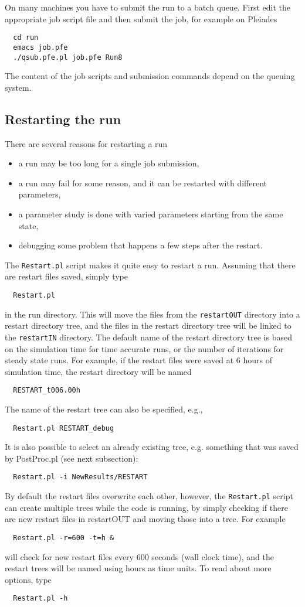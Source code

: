 On many machines you have to submit the run to a batch queue.
First edit the appropriate job script file and then submit the job,
for example on Pleiades
\begin{verbatim}
  cd run
  emacs job.pfe
  ./qsub.pfe.pl job.pfe Run8
\end{verbatim}
The content of the job scripts and submission commands depend on
the queuing system. 

\subsection{Restarting the run}

There are several reasons for restarting a run
\begin{itemize}
\item a run may be too long for a single job submission,
\item a run may fail for some reason, and it can be restarted with different parameters,
\item a parameter study is done with varied parameters starting from the same state,
\item debugging some problem that happens a few steps after the restart.
\end{itemize}
The {\tt Restart.pl} script makes it quite easy to restart a run. Assuming that there are
restart files saved, simply type
\begin{verbatim}
  Restart.pl
\end{verbatim}
in the run directory. This will move the files from the {\tt restartOUT}
directory into a restart directory tree, and the files in the restart
directory tree will be linked to the {\tt restartIN} directory.
The default name of the restart directory tree is based on the simulation time
for time accurate runs, or the number of iterations for steady state runs. 
For example, if the restart files 
were saved at 6 hours of simulation time, the restart directory will be named
\begin{verbatim}
  RESTART_t006.00h
\end{verbatim}
The name of the restart tree can also be specified, e.g., 
\begin{verbatim}
  Restart.pl RESTART_debug
\end{verbatim}
It is also possible to select an already existing tree, e.g. 
something that was saved by PostProc.pl (see next subsection):
\begin{verbatim}
  Restart.pl -i NewResults/RESTART
\end{verbatim}
By default the restart files overwrite each other, however, 
the {\tt Restart.pl} script can create multiple 
trees while the code is running, by simply checking if there 
are new restart files in restartOUT and moving those into 
a tree. For example
\begin{verbatim}
  Restart.pl -r=600 -t=h &
\end{verbatim}
will check for new restart files every 600 seconds (wall clock time), 
and the restart trees will be named using hours as time units.
To read about more options, type
\begin{verbatim}
  Restart.pl -h
\end{verbatim}

